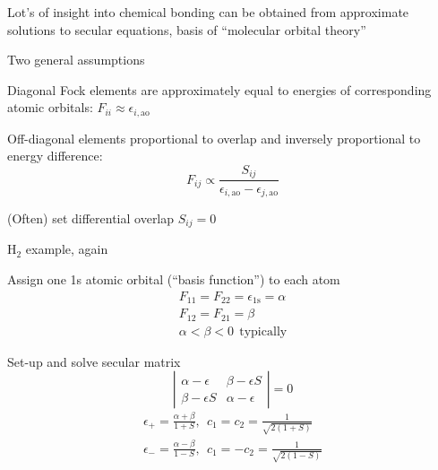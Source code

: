 \documentclass[11pt]{article}
\begin{document}
\begin{outline}
\begin{outline}
\begin{outline}
   \item Lot's of insight into chemical bonding can be obtained from
     approximate solutions to secular equations, basis of ``molecular orbital theory''
   \item Two general assumptions
     \begin{outline}
     \item Diagonal Fock elements are approximately equal to energies of
       corresponding atomic orbitals: $F_{ii} \approx \epsilon_{i,\mathrm{ao}}$
     \item Off-diagonal elements proportional to overlap and inversely
       proportional to energy difference:
       \begin{displaymath}
         F_{ij} \propto \frac{S_{ij}}{\epsilon_{i,\mathrm{ao}}-\epsilon_{j,\mathrm{ao}}}
       \end{displaymath}
     \item (Often) set differential overlap $S_{ij}=0$
     \end{outline}
   \end{outline}
 \item H$_2$ example, again
   \begin{outline}
   \item Assign one 1s atomic orbital (``basis function'') to each atom
     \begin{eqnarray*}
       F_{11}=F_{22}=\epsilon_{1\mathrm{s}}=\alpha \\
       F_{12}=F_{21}=\beta \\
       \alpha < \beta < 0\ \ \mathrm{typically}
     \end{eqnarray*}
   \item Set-up and solve secular matrix
     \begin{displaymath}
      \left | \begin{array}{cc}
          \alpha-\epsilon & \beta-\epsilon S \\
          \beta - \epsilon S & \alpha-\epsilon
          \end{array} \right | = 0
     \end{displaymath}
     \begin{eqnarray*}
       \epsilon_+=\frac{\alpha+\beta}{1+S},\ \ c_1=c_2=\frac{1}{\sqrt{2(1+S)}} \\
       \epsilon_-=\frac{\alpha-\beta}{1-S},\ \ c_1=-c_2=\frac{1}{\sqrt{2(1-S)}} \\
     \end{eqnarray*}
     \begin{center}

\end{center}
\end{outline}
\end{outline}
\end{outline}
\end{document}

